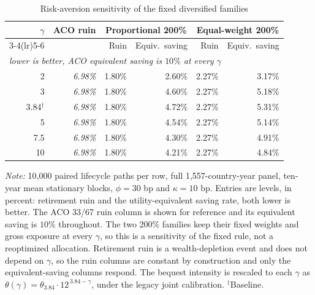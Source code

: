 \begin{table}[H]
\centering
\caption{Risk-aversion sensitivity of the fixed diversified families}
\label{tab:gamma-sensitivity}
\small\setlength{\tabcolsep}{4pt}
\begin{tabular}{rrrrrr}
\toprule
$\gamma$ & ACO ruin & \multicolumn{2}{c}{Proportional 200\%} & \multicolumn{2}{c}{Equal-weight 200\%} \\
\cmidrule(lr){3-4}\cmidrule(lr){5-6}
 & & Ruin & Equiv.\ saving & Ruin & Equiv.\ saving \\
\multicolumn{6}{l}{\footnotesize\emph{lower is better, ACO equivalent saving is $10\%$ at every $\gamma$}} \\
\midrule
2 & \emph{6.98\%} & 1.80\% & 2.60\% & 2.27\% & 3.17\% \\
3 & \emph{6.98\%} & 1.80\% & 4.60\% & 2.27\% & 5.18\% \\
3.84$^{\dagger}$ & \emph{6.98\%} & 1.80\% & 4.72\% & 2.27\% & 5.31\% \\
5 & \emph{6.98\%} & 1.80\% & 4.54\% & 2.27\% & 5.14\% \\
7.5 & \emph{6.98\%} & 1.80\% & 4.30\% & 2.27\% & 4.91\% \\
10 & \emph{6.98\%} & 1.80\% & 4.21\% & 2.27\% & 4.84\% \\
\bottomrule
\end{tabular}
\begin{minipage}{0.95\textwidth}\footnotesize
\textit{Note:} 10{,}000 paired lifecycle paths per row, full 1{,}557-country-year panel, ten-year mean stationary blocks, $\phi=30$ bp and $\kappa=10$ bp. Entries are levels, in percent: retirement ruin and the utility-equivalent saving rate, both lower is better. The ACO 33/67 ruin column is shown for reference and its equivalent saving is $10\%$ throughout. The two 200\% families keep their fixed weights and gross exposure at every $\gamma$, so this is a sensitivity of the fixed rule, not a reoptimized allocation. Retirement ruin is a wealth-depletion event and does not depend on $\gamma$, so the ruin columns are constant by construction and only the equivalent-saving columns respond. The bequest intensity is rescaled to each $\gamma$ as $\theta(\gamma)=\theta_{3.84}\cdot 12^{\,3.84-\gamma}$, under the legacy joint calibration. $^{\dagger}$Baseline.
\end{minipage}
\end{table}
